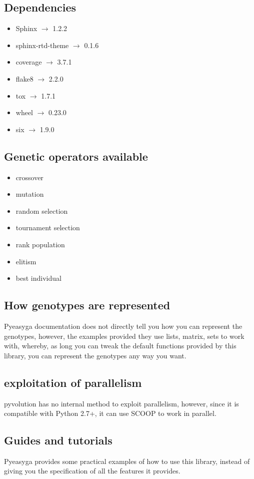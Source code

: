 \documentclass{article}
\begin{document}
	\subsection{Dependencies}
	\begin{itemize}
		\item Sphinx $\rightarrow$ 1.2.2
		\item sphinx-rtd-theme $\rightarrow$ 0.1.6
		\item coverage $\rightarrow$ 3.7.1
		\item flake8 $\rightarrow$ 2.2.0
		\item tox $\rightarrow$ 1.7.1
		\item wheel $\rightarrow$ 0.23.0
		\item six $\rightarrow$ 1.9.0
	\end{itemize}
	\subsection{Genetic operators available}
	\begin{itemize}
		\item crossover
		\item mutation
		\item random selection
		\item tournament selection
		\item rank population
		\item elitism
		\item best individual
	\end{itemize}
	\subsection{How genotypes are represented}
	Pyeasyga documentation does not directly tell you how you can represent the genotypes, however,  the examples provided they use lists, matrix, sets to work with, whereby, as long you can tweak the default functions provided by this library, you can represent the genotypes any way you want.
	\subsection{exploitation of parallelism}
	pyvolution has no internal method to exploit parallelism, however, since it is compatible with Python 2.7+, it can use SCOOP to work in parallel.
	\subsection{Guides and tutorials}
	Pyeasyga provides some practical examples of how to use this library, instead of giving you the specification of all the features it provides. 
\end{document}

